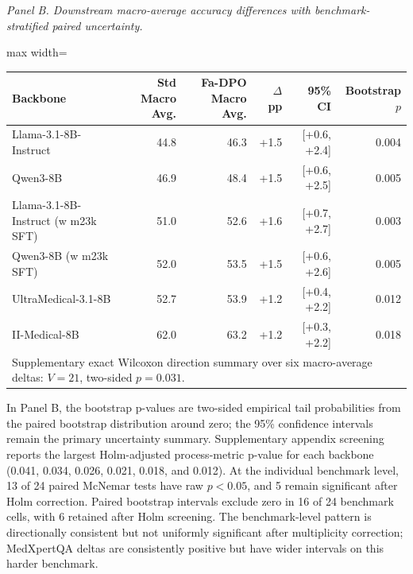 \documentclass[12pt]{article}
\begin{document}
\begin{table}[htbp]
\vspace{0.45em}
\textit{Panel B. Downstream macro-average accuracy differences with benchmark-stratified paired uncertainty.}\\[0.2em]
\begin{adjustbox}{max width=\textwidth}
\begin{tabular}{lrrrrr}
\toprule
\textbf{Backbone} & \textbf{Std Macro Avg.} & \textbf{Fa-DPO Macro Avg.} & \textbf{$\Delta$ pp} & \textbf{95\% CI} & \textbf{Bootstrap $p$} \\
\midrule
Llama-3.1-8B-Instruct & 44.8 & 46.3 & +1.5 & [+0.6, +2.4] & 0.004 \\
Qwen3-8B & 46.9 & 48.4 & +1.5 & [+0.6, +2.5] & 0.005 \\
Llama-3.1-8B-Instruct (w m23k SFT) & 51.0 & 52.6 & +1.6 & [+0.7, +2.7] & 0.003 \\
Qwen3-8B (w m23k SFT) & 52.0 & 53.5 & +1.5 & [+0.6, +2.6] & 0.005 \\
UltraMedical-3.1-8B & 52.7 & 53.9 & +1.2 & [+0.4, +2.2] & 0.012 \\
II-Medical-8B & 62.0 & 63.2 & +1.2 & [+0.3, +2.2] & 0.018 \\
\midrule
\multicolumn{6}{l}{Supplementary exact Wilcoxon direction summary over six macro-average deltas: $V=21$, two-sided $p=0.031$.} \\
\bottomrule
\end{tabular}
\end{adjustbox}
\end{table}

In Panel B, the bootstrap p-values are two-sided empirical tail probabilities
from the paired bootstrap distribution around zero; the 95\% confidence intervals
remain the primary uncertainty summary. Supplementary appendix screening reports
the largest Holm-adjusted process-metric p-value for each backbone
(0.041, 0.034, 0.026, 0.021, 0.018, and 0.012). At the individual benchmark
level, 13 of 24 paired McNemar tests have raw $p<0.05$, and 5 remain significant
after Holm correction. Paired bootstrap intervals exclude zero in 16 of 24
benchmark cells, with 6 retained after Holm screening. The benchmark-level
pattern is directionally consistent but not uniformly significant after
multiplicity correction; MedXpertQA deltas are consistently positive but have
wider intervals on this harder benchmark.
\end{document}
